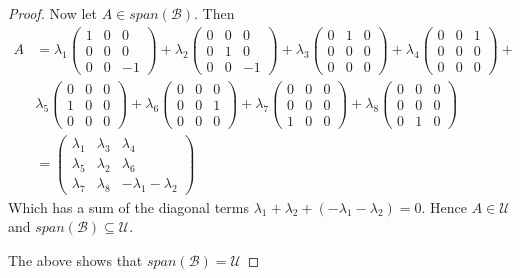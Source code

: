 \documentclass{article}
\begin{document}
\begin{proof}
Now let $A \in span(\mathcal{B})$. Then
\begin{align*}
A &= \lambda_1 \begin{pmatrix} 1&0&0\\0&0&0\\0&0&-1 \end{pmatrix}+\lambda_2 \begin{pmatrix} 0&0&0\\0&1&0\\0&0&-1 \end{pmatrix}+\lambda_3 \begin{pmatrix} 0&1&0\\0&0&0\\0&0&0 \end{pmatrix}+\lambda_4\begin{pmatrix} 0&0&1\\0&0&0\\0&0&0 \end{pmatrix}+ \\
&\lambda_5 \begin{pmatrix} 0&0&0\\1&0&0\\0&0&0 \end{pmatrix}+\lambda_6\begin{pmatrix} 0&0&0\\0&0&1\\0&0&0 \end{pmatrix}+\lambda_7 \begin{pmatrix} 0&0&0\\0&0&0\\1&0&0 \end{pmatrix}+\lambda_8 \begin{pmatrix} 0&0&0\\0&0&0\\0&1&0 \end{pmatrix} \\
&= \begin{pmatrix} \lambda_1&\lambda_3&\lambda_4 \\ \lambda_5&\lambda_2&\lambda_6 \\ \lambda_7&\lambda_8&-\lambda_1 -\lambda_2 \end{pmatrix}
\end{align*}
Which has a sum of the diagonal terms $\lambda_1+\lambda_2+ (-\lambda_1-\lambda_2) = 0$. Hence $A \in \mathcal{U}$ and $ span(\mathcal{B}) \subseteq \mathcal{U}$.

The above shows that $span(\mathcal{B}) = \mathcal{U}$
\medskip


\end{proof}
\end{document}
